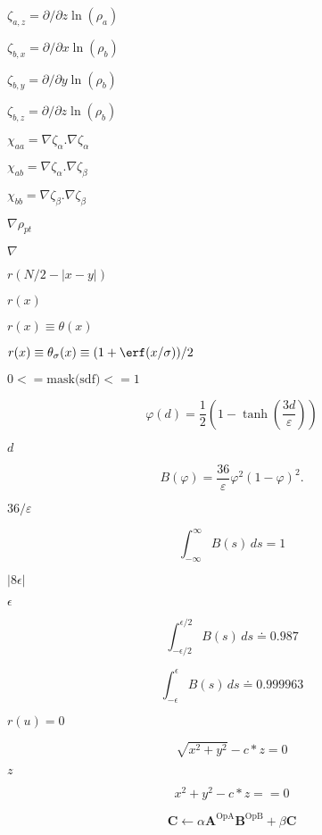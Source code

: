 \documentclass{article}
\begin{document}
$ \zeta_{a,z}=\partial/{\partial z} \ln(\rho_a)  $
\pagebreak

$ \zeta_{b,x} = \partial/{\partial x} \ln(\rho_b)  $
\pagebreak

$ \zeta_{b,y} = \partial/{\partial y} \ln(\rho_b)  $
\pagebreak

$ \zeta_{b,z} = \partial/{\partial z} \ln(\rho_b)  $
\pagebreak

$ \chi_{aa} = \nabla \zeta_{\alpha}.\nabla \zeta_{\alpha} $
\pagebreak

$ \chi_{ab} = \nabla \zeta_{\alpha}.\nabla \zeta_{\beta} $
\pagebreak

$ \chi_{bb} = \nabla \zeta_{\beta}.\nabla \zeta_{\beta} $
\pagebreak

$ \nabla\rho_{pt}$
\pagebreak

$ \nabla $
\pagebreak

$ r(N/2 - |x-y|) $
\pagebreak

$ r(x) $
\pagebreak

$ r(x) \equiv \theta(x)$
\pagebreak

$ r(x) \equiv \theta_\sigma(x) \equiv (1 + \erf(x/\sigma))/2 $
\pagebreak

$0 <=  \mbox{mask(sdf)} <= 1$
\pagebreak

\[ \varphi(d) = \frac{1}{2}\left( 1 - \tanh\left(
                 \frac{3d}{\varepsilon} \right) \right) \]
\pagebreak

$d$
\pagebreak

\[ B(\varphi) = \frac{36}{\varepsilon} \varphi^2 (1-\varphi)^2. \]
\pagebreak

$36/\varepsilon$
\pagebreak

\[ \int_{-\infty}^\infty B(s) \, ds = 1 \]
\pagebreak

$ |8 \epsilon| $
\pagebreak

$ \epsilon $
\pagebreak

\[ \int_{-\epsilon/2}^{\epsilon/2} B(s) \, ds \doteq 0.987 \]
\pagebreak

\[ \int_{-\epsilon}^{\epsilon} B(s) \, ds \doteq 0.999963 \]
\pagebreak

$r(u) = 0$
\pagebreak

\[ \sqrt{x^2 + y^2} - c * z = 0 \]
\pagebreak

$ z $
\pagebreak

\[ x^2 + y^2 - c * z == 0 \]
\pagebreak

\[
 \mathbf{C} \leftarrow \alpha \mathbf{A}^{\mathrm{OpA}} \mathbf{B}^{\mathrm{OpB}} + \beta \mathbf{C}
 \]
\pagebreak
\end{document}
